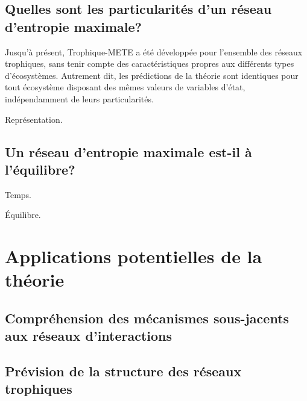 \subsection{Quelles sont les particularités d'un réseau d'entropie maximale?} 

Jusqu'à présent, Trophique-METE a été développée pour l'ensemble des réseaux
trophiques, sans tenir compte des caractéristiques propres aux différents types
d'écosystèmes. Autrement dit, les prédictions de la théorie sont identiques pour
tout écosystème disposant des mêmes valeurs de variables d'état, indépendamment
de leurs particularités. 

Représentation. 

\subsection{Un réseau d'entropie maximale est-il à l'équilibre?} 

Temps. 

Équilibre.


\section{Applications potentielles de la théorie} 

\subsection{Compréhension des mécanismes sous-jacents aux réseaux d'interactions} 

\subsection{Prévision de la structure des réseaux trophiques} 


\endinput

